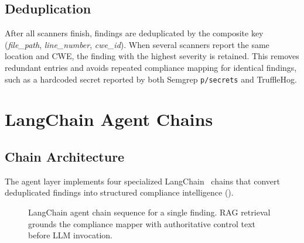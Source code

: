 \documentclass[conference]{IEEEtran}
\begin{document}
\subsection{Deduplication}
After all scanners finish, findings are deduplicated by the composite key
(\textit{file\_path}, \textit{line\_number}, \textit{cwe\_id}). When several
scanners report the same location and CWE, the finding with the highest severity
is retained. This removes redundant entries and avoids repeated compliance
mapping for identical findings, such as a hardcoded secret reported by both
Semgrep \texttt{p/secrets} and TruffleHog.

\section{LangChain Agent Chains}
\label{sec:agent}

\subsection{Chain Architecture}
The agent layer implements four specialized LangChain~\cite{langchain} chains
that convert deduplicated findings into structured compliance intelligence
().

\begin{figure}[!t]
\centering
{}
\caption{LangChain agent chain sequence for a single finding. RAG retrieval
grounds the compliance mapper with authoritative control text before LLM
invocation.}
\label{fig:chains}
\end{figure}
\end{document}

